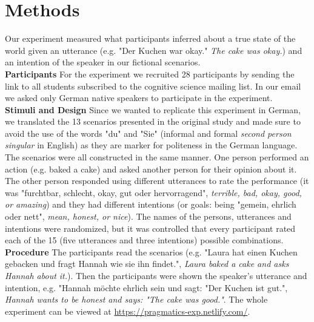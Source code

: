 \documentclass[a4paper,11pt]{article}
\begin{document}
\section{Methods}
Our experiment measured what participants inferred about a true state of the world given an utterance (e.g. "Der Kuchen war okay." \textit{The cake was okay.}) and an intention of the speaker in our fictional scenarios. \\
\textbf{Participants} For the experiment we recruited 28 participants by sending the link to all students subscribed to the cognitive science mailing list. In our email we asked only German native speakers to participate in the experiment.\\
\textbf{Stimuli and Design} Since we wanted to replicate this experiment in German, we translated the 13 scenarios presented in the original study and made sure to avoid the use of the words "du" and "Sie" (informal and formal \textit{second person singular} in English) as they are marker for politeness in the German language. The scenarios were all constructed in the same manner. One person performed an action (e.g. baked a cake) and asked another person for their opinion about it. The other person responded using different utterances to rate the performance (it was "furchtbar, schlecht, okay, gut oder hervorragend", \textit{terrible, bad, okay, good, or amazing}) and they had different intentions (or goals: being "gemein, ehrlich oder nett", \textit{mean, honest, or nice}). The names of the persons, utterances and intentions were randomized, but it was controlled that every participant rated each of the 15 (five utterances and three intentions) possible combinations.\\
\textbf{Procedure} The participants read the scenarios (e.g. "Laura hat einen Kuchen gebacken und fragt Hannah wie sie ihn findet.", \textit{Laura baked a cake and asks Hannah about it.}). Then the participants were shown the speaker's utterance and intention, e.g. "Hannah möchte ehrlich sein und sagt: "Der Kuchen ist gut.", \textit{Hannah wants to be honest and says: "The cake was good."}. The whole experiment can be viewed at \url{https://pragmatics-exp.netlify.com/}. 
\end{document}
